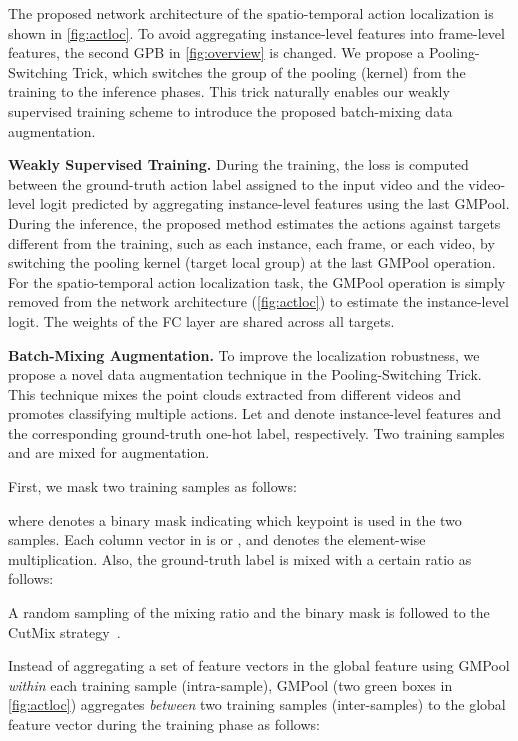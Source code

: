 \documentclass[10pt,twocolumn,letterpaper]{article}
\begin{document}
The proposed network architecture of the spatio-temporal action localization is shown in \cref{fig:actloc}.
To avoid aggregating instance-level features into frame-level features, the second GPB in \cref{fig:overview} is changed.
We propose a Pooling-Switching Trick, which switches the group of the pooling (kernel) from the training to the inference phases.
This trick naturally enables our weakly supervised training scheme to introduce the proposed batch-mixing data augmentation.

\noindent \textbf{Weakly Supervised Training.}
During the training, the loss is computed between the ground-truth action label assigned to the input video and the video-level logit predicted by aggregating instance-level features using the last GMPool.
During the inference, the proposed method estimates the actions against targets different from the training, such as each instance, each frame, or each video, by switching the pooling kernel (target local group) at the last GMPool operation.
For the spatio-temporal action localization task, the GMPool operation is simply removed from the network architecture (\cref{fig:actloc}) to estimate the instance-level logit.
The weights of the FC layer are shared across all targets.

\noindent \textbf{Batch-Mixing Augmentation.}
To improve the localization robustness, we propose a novel data augmentation technique in the Pooling-Switching Trick. This technique mixes the point clouds extracted from different videos and promotes classifying multiple actions.
Let  and  denote instance-level features and the corresponding ground-truth one-hot label, respectively.
Two training samples  and  are mixed for augmentation.

First, we mask two training samples as follows:

where  denotes a binary mask indicating which keypoint is used in the two samples.
Each column vector in  is  or , and  denotes the element-wise multiplication.
Also, the ground-truth label is mixed with a certain ratio  as follows:

A random sampling of the mixing ratio  and the binary mask is followed to the CutMix strategy~\cite{Yun2019ICCV}.

Instead of aggregating a set of feature vectors in the global feature using GMPool \textit{within} each training sample (intra-sample), GMPool (two green boxes in \cref{fig:actloc}) aggregates \textit{between} two training samples (inter-samples) to the global feature vector during the training phase as follows:
\end{document}
